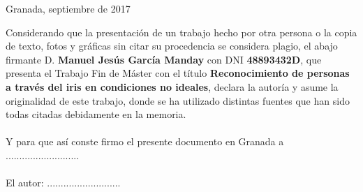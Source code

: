 \documentclass[
11pt, %
spanish, %
doublespacing, %
headsepline, %
]{MastersDoctoralThesis} %
\begin{document}
\begin{titlepage}
\begin{center}
\vfill

 
\vfill

{\large Granada, septiembre de 2017}\\[4cm] %
 
\vfill
\end{center}
\end{titlepage}


\begin{declaration}
\noindent Considerando que la presentación de un trabajo hecho por otra persona o la copia de texto, fotos y gráficas sin citar su procedencia se considera plagio, el abajo firmante D. \textbf{Manuel Jesús García Manday} con DNI \textbf{48893432D},
que presenta el Trabajo Fin de Máster con el título \textbf{Reconocimiento de personas a través del iris en condiciones no ideales}, declara la autoría y asume la originalidad de este trabajo, donde se ha utilizado distintas fuentes que han sido todas citadas debidamente en la memoria. \\ \\

Y para que así conste firmo el presente documento en Granada a ...........................\\ \\

El autor: ...........................\\

\end{declaration}

\cleardoublepage

\end{document}
